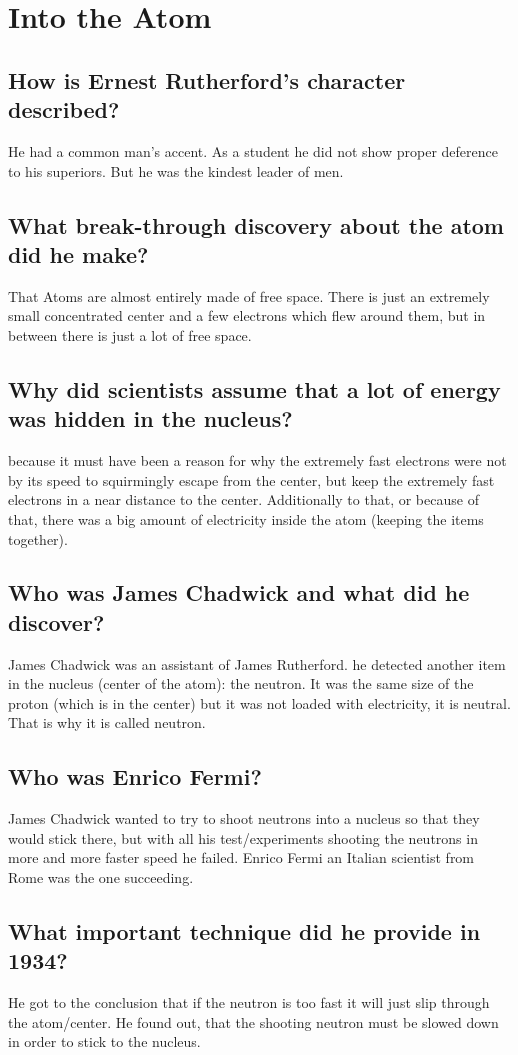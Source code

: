 %

\section{Into the Atom}

\subsection*{How is Ernest Rutherford’s character described?}
He had a common man's accent.
As a student he did not show proper deference to his superiors. But he was the kindest leader of men.

\subsection*{What break-through discovery about the atom did he make?}
That Atoms are almost entirely made of free space. There is just an extremely small concentrated center and a few electrons which flew around them, but in between there is just a lot of free space.

\subsection*{Why did scientists assume that a lot of energy was hidden in the nucleus?}
because it must have been a reason for why the extremely fast electrons were not by its speed to squirmingly escape from the center, but keep the extremely fast electrons in a near distance to the center. Additionally to that, or because of that, there was a big amount of electricity inside the atom (keeping the items together).

\subsection*{Who was James Chadwick and what did he discover?}
James Chadwick was an assistant of James Rutherford. he detected another item in the nucleus (center of the atom): the neutron. It was the same size of the proton (which is in the center) but it was not loaded with electricity, it is neutral. That is why it is called neutron.

\subsection*{Who was Enrico Fermi?}
James Chadwick wanted to try to shoot neutrons into a nucleus so that they would stick there, but with all his test/experiments shooting the neutrons in more and more faster speed he failed. Enrico Fermi an Italian scientist from Rome was the one succeeding. 

\subsection*{What important technique did he provide in 1934?}
He got to the conclusion that if the neutron is too fast it will just slip through the atom/center. He found out, that the shooting neutron must be slowed down in order to stick to the nucleus.
